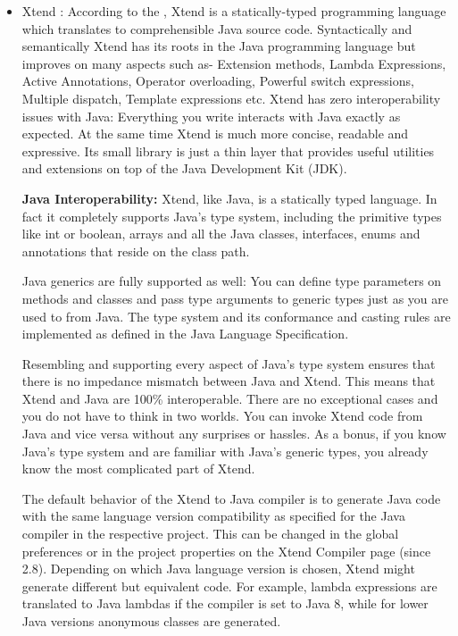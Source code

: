 \begin{itemize}
	\item Xtend : According to the \cite{ref_92_xtend:xtend}, Xtend is a statically-typed programming language which translates to comprehensible Java source code. Syntactically and semantically Xtend has its roots in the Java programming language but improves on many aspects such as- Extension methods, Lambda Expressions, Active Annotations, Operator overloading, Powerful switch expressions, Multiple dispatch, Template expressions etc. Xtend has zero interoperability issues with Java: Everything you write interacts with Java exactly as expected. At the same time Xtend is much more concise, readable and expressive. Its small library is just a thin layer that provides useful utilities and extensions on top of the Java Development Kit (JDK). 
	
	\textbf{Java Interoperability:}
	Xtend, like Java, is a statically typed language. In fact it completely supports Java's type system, including the primitive types like int or boolean, arrays and all the Java classes, interfaces, enums and annotations that reside on the class path.
	
	Java generics are fully supported as well: You can define type parameters on methods and classes and pass type arguments to generic types just as you are used to from Java. The type system and its conformance and casting rules are implemented as defined in the Java Language Specification.
	
	Resembling and supporting every aspect of Java's type system ensures that there is no impedance mismatch between Java and Xtend. This means that Xtend and Java are 100\% interoperable. There are no exceptional cases and you do not have to think in two worlds. You can invoke Xtend code from Java and vice versa without any surprises or hassles. As a bonus, if you know Java's type system and are familiar with Java's generic types, you already know the most complicated part of Xtend.
	
	The default behavior of the Xtend to Java compiler is to generate Java code with the same language version compatibility as specified for the Java compiler in the respective project. This can be changed in the global preferences or in the project properties on the Xtend  Compiler page (since 2.8). Depending on which Java language version is chosen, Xtend might generate different but equivalent code. For example, lambda expressions are translated to Java lambdas if the compiler is set to Java 8, while for lower Java versions anonymous classes are generated.
	

\end{itemize}
